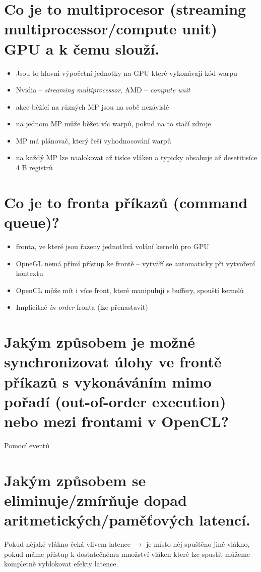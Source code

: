 \section{Co je to multiprocesor (streaming multiprocessor/compute unit) GPU a k čemu slouží.}
	\begin{itemize}
		\setlength\itemsep{0em}
		\item Jsou to hlavni výpočetní jednotky na GPU které vykonávají kód warpu
		\item Nvidia -- \emph{streaming multiprocessor}, AMD -- \emph{compute unit}
		\item akce běžící na různých MP jsou na sobě nezávislé
		\item na jednom MP může běžet víc warpů, pokud na to stačí zdroje
		\item MP má plánovač, který řeší vyhodnocování warpů
		\item na každý MP lze naalokovat až tisíce vláken a typicky obsahuje až desetitisíce 4 B registrů
	\end{itemize}


\section{Co je to fronta příkazů (command queue)?}
	\begin{itemize}
		\setlength\itemsep{0em}
		\item fronta, ve které jsou řazeny jednotlivá volání kernelů pro GPU
		\item OpneGL nemá přímí přístup ke frontě -- vytváří se automaticky při vytvoření kontextu
		\item OpenCL může mít i více front, které manipulují s buffery, spouští kernelů
		\item Implicitně \emph{in-order} fronta (lze přenastavit)
	\end{itemize}


\section{Jakým způsobem je možné synchronizovat úlohy ve frontě příkazů s vykonáváním mimo pořadí (out-of-order execution) nebo mezi frontami v OpenCL?}
	Pomocí eventů


\section{Jakým způsobem se eliminuje/zmírňuje dopad aritmetických/paměťových latencí.}
	Pokud nějaké vlákno čeká vlivem latence $\rightarrow$ je místo něj spuštěno jiné vlákno, pokud máme přístup k dostatečnému množství vláken které lze spustit můžeme kompletně vyblokovat efekty latence.


